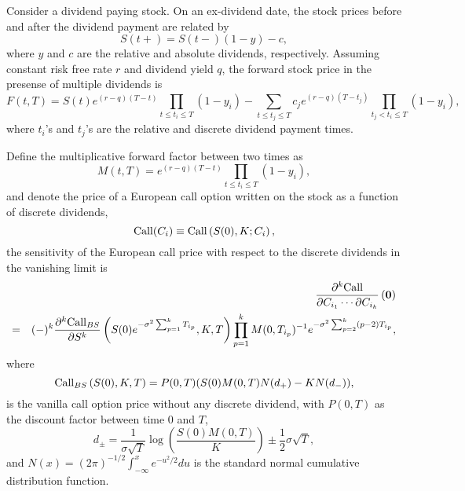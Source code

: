 \documentclass[12pt]{article}
\begin{document}
  Consider a dividend paying stock. On an ex-dividend date, the stock prices before and after the
  dividend payment are related by
  \begin{equation}
    S(t+) = S(t-)(1-y)-c,
  \end{equation}
  where $y$ and $c$ are the relative and absolute dividends, respectively. Assuming constant risk
  free rate $r$ and dividend yield $q$, the forward stock price in the presense of multiple dividends
  is
  \begin{equation}
    F(t,T)=S(t)e^{(r-q)(T-t)}\prod_{t\le t_i\le T}(1-y_i)
          -\sum_{t\le t_j\le T}c_je^{(r-q)(T-t_j)}\prod_{t_j< t_i\le T}(1-y_i),
  \end{equation}
  where $t_i$'s and $t_j$'s are the relative and discrete dividend payment times.

  Define the multiplicative forward factor between two times as
  \begin{equation}
    M(t,T)=e^{(r-q)(T-t)}\prod_{t\le t_i\le T}(1-y_i),
  \end{equation}
  and denote the price of a European call option written on the stock as a function of discrete
  dividends,
  \begin{equation}
    {\rm Call}({C_i}) \equiv {\rm Call}\left(S(0),K; {C_i}\right),
  \end{equation}
  the sensitivity of the European call price with respect to the discrete dividends in the vanishing
  limit is \cite{GS}
  \begin{eqnarray}
    &&\frac{\partial^k{\rm Call}}{\partial C_{i_1}\cdots\partial C_{i_k}}\left({\bf 0}\right) \nonumber\\
    =&&(-)^k\frac{\partial^k{\rm Call}_{BS}}{\partial S^k}\left(S(0)e^{-\sigma^2\sum_{p=1}^kT_{i_p}}, K, T\right)
     \prod_{p=1}^kM(0,T_{i_p})^{-1}e^{-\sigma^2\sum_{p=2}^k(p-2)T_{i_p}},
  \end{eqnarray}
  where
  \begin{equation}
    {\rm Call}_{BS}\left(S(0), K, T\right) = P(0,T)(S(0)M(0,T)N(d_+)-KN(d_-)),
  \end{equation}
  is the vanilla call option price without any discrete dividend, with $P(0,T)$ as the discount factor
  between time 0 and $T$,
  \begin{equation}
    d_{\pm} = \frac{1}{\sigma\sqrt{T}}\log\left(\frac{S(0)M(0,T)}{K}\right)\pm\frac{1}{2}\sigma\sqrt{T},
  \end{equation}
  and $N(x)=(2\pi)^{-1/2}\int_{-\infty}^xe^{-u^2/2}du$ is the standard normal cumulative
  distribution function.
\end{document}
